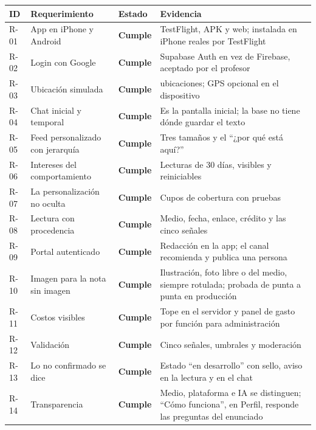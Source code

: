 \documentclass[12pt,a4paper]{article}
\newcommand{\cumple}{\textcolor{verde}{\textbf{Cumple}}}
\begin{document}
{\renewcommand{\arraystretch}{1.3}
\begin{longtable}{|p{1.1cm}|>{\raggedright\arraybackslash}p{4.4cm}|p{1.6cm}|>{\raggedright\arraybackslash}p{6.2cm}|}
\hline
\textbf{ID} & \textbf{Requerimiento} & \textbf{Estado} & \textbf{Evidencia} \\
\hline
\endhead
R-01 & App en iPhone y Android & \cumple & TestFlight, APK y web; instalada en iPhone reales por
TestFlight \\
\hline
R-02 & Login con Google & \cumple & Supabase Auth en vez de Firebase, aceptado por el profesor \\
\hline
R-03 & Ubicación simulada & \cumple & 27 ubicaciones; GPS opcional en el dispositivo \\
\hline
R-04 & Chat inicial y temporal & \cumple & Es la pantalla inicial; la base no tiene dónde guardar
el texto \\
\hline
R-05 & Feed personalizado con jerarquía & \cumple & Tres tamaños y el ``¿por qué está aquí?'' \\
\hline
R-06 & Intereses del comportamiento & \cumple & Lecturas de 30 días, visibles y reiniciables \\
\hline
R-07 & La personalización no oculta & \cumple & Cupos de cobertura con pruebas \\
\hline
R-08 & Lectura con procedencia & \cumple & Medio, fecha, enlace, crédito y las cinco señales \\
\hline
R-09 & Portal autenticado & \cumple & Redacción en la app; el canal recomienda y publica una
persona \\
\hline
R-10 & Imagen para la nota sin imagen & \cumple & Ilustración, foto libre o del medio, siempre
rotulada; probada de punta a punta en producción \\
\hline
R-11 & Costos visibles & \cumple & Tope en el servidor y panel de gasto por función para
administración \\
\hline
R-12 & Validación & \cumple & Cinco señales, umbrales y moderación \\
\hline
R-13 & Lo no confirmado se dice & \cumple & Estado ``en desarrollo'' con sello, aviso en la
lectura y en el chat \\
\hline
R-14 & Transparencia & \cumple & Medio, plataforma e IA se distinguen; ``Cómo funciona'', en
Perfil, responde las preguntas del enunciado \\
\hline
\end{longtable}}

\end{document}
